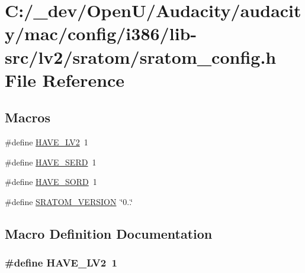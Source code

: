 \hypertarget{mac_2config_2i386_2lib-src_2lv2_2sratom_2sratom__config_8h}{}\section{C\+:/\+\_\+dev/\+Open\+U/\+Audacity/audacity/mac/config/i386/lib-\/src/lv2/sratom/sratom\+\_\+config.h File Reference}
\label{mac_2config_2i386_2lib-src_2lv2_2sratom_2sratom__config_8h}
\subsection*{Macros}
\begin{DoxyCompactItemize}
\item 
\#define \hyperlink{mac_2config_2i386_2lib-src_2lv2_2sratom_2sratom__config_8h_a3377686d402043f36819f446ef0e0edd}{H\+A\+V\+E\+\_\+\+L\+V2}~1
\item 
\#define \hyperlink{mac_2config_2i386_2lib-src_2lv2_2sratom_2sratom__config_8h_af73dc1c61a8c088c96f3a0f3a85b75dd}{H\+A\+V\+E\+\_\+\+S\+E\+RD}~1
\item 
\#define \hyperlink{mac_2config_2i386_2lib-src_2lv2_2sratom_2sratom__config_8h_a49c11735861a0675e6a29e557c574eab}{H\+A\+V\+E\+\_\+\+S\+O\+RD}~1
\item 
\#define \hyperlink{mac_2config_2i386_2lib-src_2lv2_2sratom_2sratom__config_8h_af4904d1a80a5b33aa0bc67148006cf3a}{S\+R\+A\+T\+O\+M\+\_\+\+V\+E\+R\+S\+I\+ON}~\char`\"{}0..\char`\"{}
\end{DoxyCompactItemize}


\subsection{Macro Definition Documentation}
\subsubsection[{\texorpdfstring{H\+A\+V\+E\+\_\+\+L\+V2}{HAVE_LV2}}]{\setlength{\rightskip}{0pt plus 5cm}\#define H\+A\+V\+E\+\_\+\+L\+V2~1}\hypertarget{mac_2config_2i386_2lib-src_2lv2_2sratom_2sratom__config_8h_a3377686d402043f36819f446ef0e0edd}{}\label{mac_2config_2i386_2lib-src_2lv2_2sratom_2sratom__config_8h_a3377686d402043f36819f446ef0e0edd}


